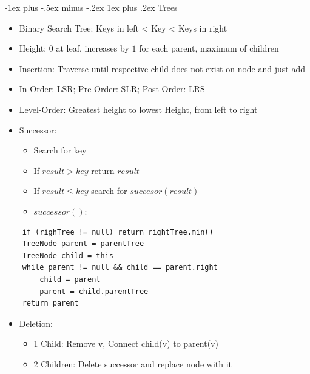 \documentclass[10pt, landscape]{article}
\makeatletter
\renewcommand{\subsection}{\@startsection{subsection}{3}{0mm}%
                                {-1ex plus -.5ex minus -.2ex}%
                                {1ex plus .2ex}%
                                {\normalfont\small\bfseries}}%
\makeatother
\begin{document}
\begin{multicols*}{4}
\subsection{Trees}
\begin{itemize}
    \item Binary Search Tree: Keys in left < Key < Keys in right
    \item Height: $0$ at leaf, increases by $1$ for each parent, maximum of children
    \item Insertion: Traverse until respective child does not exist on node and just add
    \item In-Order: LSR; Pre-Order: SLR; Post-Order: LRS
    \item Level-Order: Greatest height to lowest Height, from left to right
    \item Successor:
    \begin{itemize}
        \item Search for key
        \item If $result > key$ return $result$
        \item If $result \leq key$ search for $succesor(result)$
        \item $successor():$
    \end{itemize}
\end{itemize}
    \begin{verbatim}
    if (righTree != null) return rightTree.min()
    TreeNode parent = parentTree
    TreeNode child = this
    while parent != null && child == parent.right
        child = parent
        parent = child.parentTree
    return parent
    \end{verbatim}
\begin{itemize}
    \item Deletion:
    \begin{itemize}
        \item 1 Child: Remove v, Connect child(v) to parent(v)
        \item 2 Children: Delete successor and replace node with it
    \end{itemize}
\end{itemize}


\end{multicols*}
\end{document}
